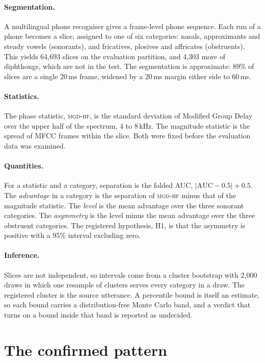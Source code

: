\documentclass[11pt]{article}
\newcommand{\mgd}{\textsc{mgd-hf}}
\begin{document}
\paragraph{Segmentation.} A multilingual phone recogniser
\citep{xu2022zeroshot} gives a frame-level phone sequence. Each run of a phone
becomes a slice, assigned to one of six categories: nasals, approximants and
steady vowels (sonorants), and fricatives, plosives and affricates
(obstruents). This yields 64,693 slices on the evaluation partition, and 4,303 more of
diphthongs, which are not in the test. The
segmentation is approximate: 89\% of slices are a single 20\,ms frame, widened
by a 20\,ms margin either side to 60\,ms.

\paragraph{Statistics.} The phase statistic, \mgd, is the standard deviation of
Modified Group Delay \citep{murthy2003mgd} over the upper half of the spectrum,
4 to 8\,kHz. The magnitude statistic is the spread of MFCC frames within the
slice. Both were fixed before the evaluation data was examined.

\paragraph{Quantities.} For a statistic and a category, separation is the
folded AUC, $|\mathrm{AUC}-0.5|+0.5$. The \emph{advantage} in a category is the
separation of \mgd{} minus that of the magnitude statistic. The \emph{level} is
the mean advantage over the three sonorant categories. The \emph{asymmetry} is
the level minus the mean advantage over the three obstruent categories. The
registered hypothesis, H1, is that the asymmetry is positive with a 95\%
interval excluding zero.

\paragraph{Inference.} Slices are not independent, so intervals come from a
cluster bootstrap \citep{efron1993bootstrap} with 2,000 draws in which one
resample of clusters serves every category in a draw. The registered cluster
is the source utterance. A percentile bound is itself an estimate, so each
bound carries a distribution-free Monte Carlo band, and a verdict that turns on
a bound inside that band is reported as undecided.

\section{The confirmed pattern}
\end{document}
